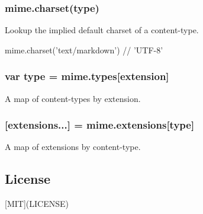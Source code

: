 \subsubsection*{mime.\+charset(type)}

Lookup the implied default charset of a content-\/type.


\begin{DoxyCode}
mime.charset('text/markdown') // 'UTF-8'
\end{DoxyCode}


\subsubsection*{var type = mime.\+types\mbox{[}extension\mbox{]}}

A map of content-\/types by extension.

\subsubsection*{\mbox{[}extensions...\mbox{]} = mime.\+extensions\mbox{[}type\mbox{]}}

A map of extensions by content-\/type.

\subsection*{License}

\mbox{[}M\+IT\mbox{]}(L\+I\+C\+E\+N\+SE) 